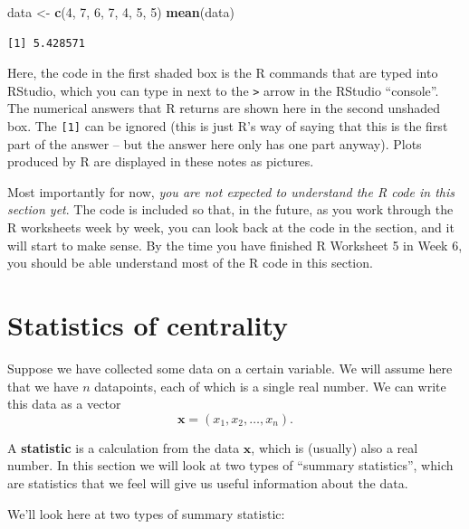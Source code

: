 \documentclass[
  a4paper,
]{book}
\newenvironment{Shaded}{\begin{snugshade}}{\end{snugshade}}
\newcommand{\DecValTok}[1]{\textcolor[rgb]{0.00,0.00,0.81}{#1}}
\newcommand{\FunctionTok}[1]{\textcolor[rgb]{0.13,0.29,0.53}{\textbf{#1}}}
\newcommand{\NormalTok}[1]{#1}
\newcommand{\OtherTok}[1]{\textcolor[rgb]{0.56,0.35,0.01}{#1}}
\theoremstyle{definition}
\theoremstyle{definition}
\theoremstyle{definition}
\theoremstyle{definition}
\theoremstyle{remark}
\begin{document}
\begin{Shaded}
\begin{Highlighting}[]
\NormalTok{data }\OtherTok{\textless{}{-}} \FunctionTok{c}\NormalTok{(}\DecValTok{4}\NormalTok{, }\DecValTok{7}\NormalTok{, }\DecValTok{6}\NormalTok{, }\DecValTok{7}\NormalTok{, }\DecValTok{4}\NormalTok{, }\DecValTok{5}\NormalTok{, }\DecValTok{5}\NormalTok{)}
\FunctionTok{mean}\NormalTok{(data)}
\end{Highlighting}
\end{Shaded}

\begin{verbatim}
[1] 5.428571
\end{verbatim}

Here, the code in the first shaded box is the R commands that are typed into
RStudio, which you can type in next to the \texttt{\textgreater{}} arrow in the RStudio ``console''. The numerical answers that R returns are shown here in the second unshaded box. The \texttt{{[}1{]}} can be ignored (this is just R's way of saying that this is the first part of the answer -- but the answer here only has one part anyway). Plots produced by R are displayed in these notes as pictures.

Most importantly for now, \emph{you are not expected to understand the R code in this section yet}. The code is included so that, in the future, as you work through the R worksheets week by week, you can look back at the code in the section, and it will start to make sense. By the time you have finished R Worksheet 5 in Week 6, you should be able understand most of the R code in this section.

\hypertarget{stat-central}{%
\section{Statistics of centrality}\label{stat-central}}

Suppose we have collected some data on a certain variable. We will assume here that we have \(n\) datapoints, each of which is a single real number. We can write this data as a vector
\[ \mathbf x = (x_1, x_2, \dots, x_n) . \]

A \textbf{statistic} is a calculation from the data \(\mathbf x\), which is (usually) also a real number. In this section we will look at two types of ``summary statistics'', which are statistics that we feel will give us useful information about the data.

We'll look here at two types of summary statistic:
\end{document}
